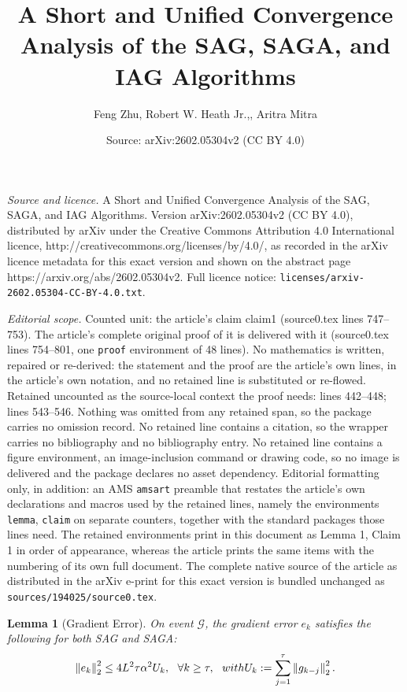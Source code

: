 \documentclass[10pt,a4paper]{amsart}
\title{A Short and Unified Convergence Analysis of the SAG, SAGA, and IAG Algorithms}
\author{Feng Zhu, Robert W. Heath Jr.,, Aritra Mitra}
\date{Source: arXiv:2602.05304v2 (CC BY 4.0)}
\newtheorem{lemma}{Lemma}
\newcommand{\cG}{\mathcal{G}}
\newcommand{\norm}[1]{\left\| #1\right\|_{2}}
\begin{document}
\maketitle

\noindent\emph{Source and licence.} A Short and Unified Convergence Analysis of the SAG, SAGA, and IAG Algorithms. Version arXiv:2602.05304v2 (CC BY 4.0), distributed by arXiv under the Creative Commons Attribution 4.0 International licence, http://creativecommons.org/licenses/by/4.0/, as recorded in the arXiv licence metadata for this exact version and shown on the abstract page https://arxiv.org/abs/2602.05304v2. Full licence notice: \texttt{licenses/arxiv-2602.05304-CC-BY-4.0.txt}.\par\smallskip

\noindent\textit{Editorial scope.} Counted unit: the article's claim claim1 (source0.tex lines 747--753). The article's complete original proof of it is delivered with it (source0.tex lines 754--801, one \texttt{proof} environment of 48 lines). No mathematics is written, repaired or re-derived: the statement and the proof are the article's own lines, in the article's own notation, and no retained line is substituted or re-flowed.  Retained uncounted as the source-local context the proof needs: lines 442--448; lines 543--546.  Nothing was omitted from any retained span, so the package carries no omission record.  No retained line contains a citation, so the wrapper carries no bibliography and no bibliography entry.  No retained line contains a figure environment, an image-inclusion command or drawing code, so no image is delivered and the package declares no asset dependency.  Editorial formatting only, in addition: an AMS \texttt{amsart} preamble that restates the article's own declarations and macros used by the retained lines, namely the environments \texttt{lemma}, \texttt{claim} on separate counters, together with the standard packages those lines need.  The retained environments print in this document as Lemma 1, Claim 1 in order of appearance, whereas the article prints the same items with the numbering of its own full document.  The complete native source of the article as distributed in the arXiv e-print for this exact version is bundled unchanged as \texttt{sources/194025/source0.tex}.
\begin{lemma}[Gradient Error]\label{lem:e_k} On event $\cG$, the gradient error $e_k$ satisfies the following for 
both SAG and SAGA:
\begin{equation}
    \norm{e_k}^2\leq 4L^2\tau\alpha^2  U_k,\ \  \forall k\geq \tau,\ \  \textup{with } U_k:=\sum_{j=1}^\tau \norm{g_{k-j}}^2.
\nonumber
\end{equation}
\end{lemma}
\end{document}
